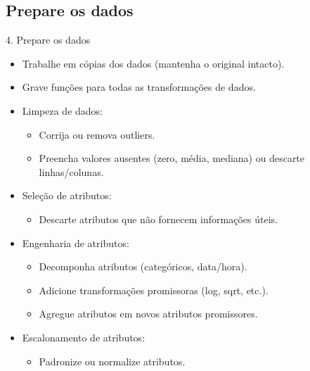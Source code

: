 \documentclass{beamer}
\begin{document}
\subsection{Prepare os dados}
\begin{frame}{4. Prepare os dados}
    \begin{itemize}
        \item Trabalhe em cópias dos dados (mantenha o original intacto).
        \item Grave funções para todas as transformações de dados.
        \item Limpeza de dados:
            \begin{itemize}
                \item Corrija ou remova outliers.
                \item Preencha valores ausentes (zero, média, mediana) ou descarte linhas/colunas.
            \end{itemize}
        \item Seleção de atributos:
            \begin{itemize}
                \item Descarte atributos que não fornecem informações úteis.
            \end{itemize}
        \item Engenharia de atributos:
            \begin{itemize}
                \item Decomponha atributos (categóricos, data/hora).
                \item Adicione transformações promissoras (log, sqrt, etc.).
                \item Agregue atributos em novos atributos promissores.
            \end{itemize}
        \item Escalonamento de atributos:
            \begin{itemize}
                \item Padronize ou normalize atributos.
            \end{itemize}
    \end{itemize}
\end{frame}
\end{document}

